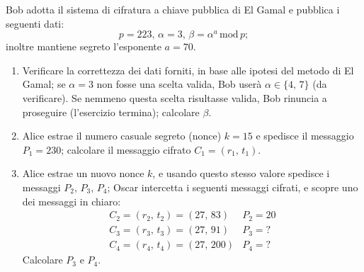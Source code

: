         Bob adotta il sistema di cifratura a chiave pubblica di El Gamal e pubblica i seguenti dati: \[
            p=223,\, \alpha=3,\, \beta= \alpha^{a} \,\mathrm{mod}\, p
        ;\] inoltre mantiene segreto l'esponente $a=70$.
        \begin{enumerate}
            \item Verificare la correttezza dei dati forniti, in base alle ipotesi del metodo di 
                El Gamal; se $\alpha=3$ non fosse una scelta valida, Bob userà $\alpha\in\{4,\,7\}$ 
                (da verificare). Se nemmeno questa scelta risultasse valida, Bob rinuncia a proseguire 
                (l'esercizio termina); calcolare $\beta$.
            \item Alice estrae il numero casuale segreto (nonce) $k=15$ e spedisce il messaggio $P_1=230$; 
                calcolare il messaggio cifrato $C_1=(r_1,\,t_1)$.
            \item Alice estrae un nuovo nonce $k$, e usando questo stesso valore spedisce i messaggi 
                $P_2,\,P_3,\,P_4$; Oscar intercetta i seguenti messaggi cifrati, e scopre uno dei messaggi 
                in chiaro: \[
                \begin{array}{ll}
                    C_2=(r_2,\,t_2)=(27,\,83) & P_2=20\\
                    C_3=(r_3,\,t_3)=(27,\,91) & P_3=?\\
                    C_4=(r_4,\,t_4)=(27,\,200) & P_4=?
                \end{array}
                \] Calcolare $P_3$ e $P_4$.
        \end{enumerate}
